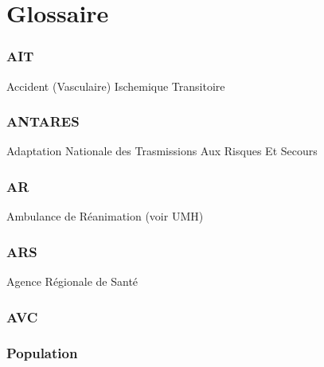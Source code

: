 \documentclass[12pt,english,french,twoside]{report}\usepackage[]{graphicx}\usepackage[]{color}
\begin{document}
\chapter{Glossaire}





\subsection*{AIT}
Accident (Vasculaire) Ischemique Transitoire

\subsection*{ANTARES}
Adaptation Nationale des Trasmissions Aux Risques Et Secours

\subsection*{AR}
Ambulance de Réanimation (voir UMH)

\subsection*{ARS}
Agence Régionale de Santé

\subsection*{AVC}

\subsection*{Population}
\end{document}
